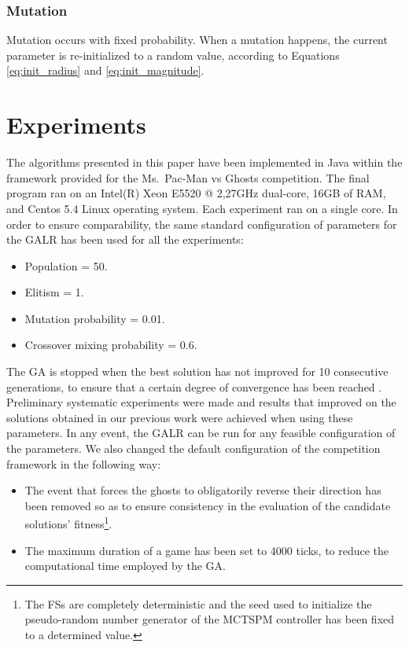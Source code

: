 \documentclass[journal]{IEEEtran}
\begin{document}
\subsubsection{Mutation}
Mutation occurs with fixed probability. When a mutation happens, the current parameter is re-initialized to a random value, according to Equations \eqref{eq:init_radius} and \eqref{eq:init_magnitude}.

\section{Experiments}
\label{sec:Experiments}
The algorithms presented in this paper have been implemented in Java within the framework provided for the Ms.\  Pac-Man vs Ghosts competition. The final program ran on an Intel(R) Xeon E5520 @ 2,27GHz dual-core, 16GB of RAM, and Centos 5.4 Linux operating system. Each experiment ran on a single core. In order to ensure comparability, the same standard configuration of parameters for the GALR has been used for all the experiments:

\begin{itemize}
  \item Population = 50.
  \item Elitism = 1.
  \item Mutation probability = 0.01.
  \item Crossover mixing probability = 0.6.
\end{itemize}

The GA is stopped when the best solution has not improved for 10 consecutive generations, to ensure that a certain degree of convergence has been reached \cite{Karma2003, Safe2004}. Preliminary systematic experiments were made and results that improved on the solutions obtained in our previous work \cite{Liberatore2014} were achieved when using these parameters. In any event, the GALR can be run for any feasible configuration of the parameters.  We also changed the default configuration of the competition framework in the following way:

\begin{itemize}
  \item The event that forces the ghosts to obligatorily reverse their direction has been removed so as to ensure consistency in the evaluation of the candidate solutions' fitness\footnote{The FSs are completely deterministic and the seed used to initialize the pseudo-random number generator of the MCTSPM controller has been fixed to a determined value.}.
  \item The maximum duration of a game has been set to 4000 ticks, to reduce the computational time employed by the GA.
\end{itemize}
\end{document}

